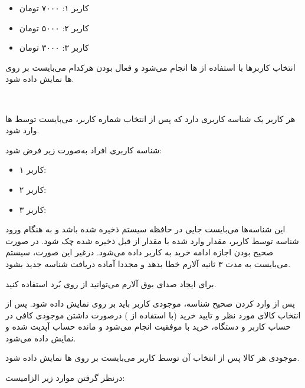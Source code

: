 \documentclass[]{article}
\begin{document}
\begin{itemize}
	\item کاربر ۱: ۷۰۰۰ تومان
	\item کاربر ۲: ۵۰۰۰ تومان
	\item کاربر ۳: ۳۰۰۰ تومان 
\end{itemize}



انتخاب کاربر‌ها با استفاده از  ها انجام می‌شود و فعال بودن هرکدام می‌بایست بر روی  ها نمایش داده شود.

\newpage
\Large \textbf{\\
}

هر کاربر یک شناسه کاربری دارد که پس از انتخاب شماره کاربر، می‌بایست توسط  ها وارد شود.

شناسه کاربری افراد به‌صورت زیر فرض شود:

\begin{itemize}
	\item کاربر ۱: 
	\item کاربر ۲: 
	\item کاربر ۳: 
\end{itemize}

این شناسه‌ها می‌بایست جایی در حافظه سیستم ذخیره شده باشد و به هنگام ورود شناسه توسط کاربر، مقدار وارد شده با مقدار از قبل ذخیره شده چک شود. در صورت صحیح بودن اجازه ادامه خرید به کاربر داده می‌شود. درغیر این صورت، سیستم می‌بایست به مدت ۳ ثانیه آلارم خطا بدهد و مجددا آماده دریافت شناسه جدید بشود.

برای ایجاد صدای بوق آلارم می‌توانید از  روی بُرد استفاده کنید.

پس از وارد کردن صحیح شناسه، موجودی کاربر باید بر روی  نمایش داده شود. پس از انتخاب کالای مورد نظر و تایید خرید (با استفاده از ) درصورت داشتن موجودی کافی در حساب کاربر و دستگاه، خرید با موفقیت انجام می‌شود و مانده حساب آپدیت شده و نمایش داده می‌شود.

موجودی هر کالا پس از انتخاب آن توسط کاربر می‌بایست بر روی  ها نمایش داده شود.



درنظر گرفتن موارد زیر الزامیست:
\end{document}
